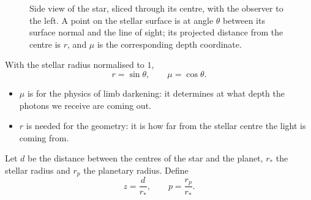 \documentclass[11pt,a4paper]{article}
\begin{document}
\begin{figure}[H]
  \centering
  \caption{Side view of the star, sliced through its centre, with the observer
  to the left. A point on the stellar surface is at angle $\theta$ between its
  surface normal and the line of sight; its projected distance from the centre
  is $r$, and $\mu$ is the corresponding depth coordinate.}
  \label{fig:conventions}
\end{figure}

With the stellar radius normalised to $1$,
\begin{equation}
  r = \sin\theta, \qquad \mu = \cos\theta .
\end{equation}
\begin{itemize}
  \item $\mu$ is for the physics of limb darkening: it determines at what
        depth the photons we receive are coming out.
  \item $r$ is needed for the geometry: it is how far from the stellar centre
        the light is coming from.
\end{itemize}

Let $d$ be the distance between the centres of the star and the planet, $r_*$
the stellar radius and $r_p$ the planetary radius. Define
\begin{equation}
  z = \frac{d}{r_*}, \qquad p = \frac{r_p}{r_*}.
\end{equation}
\end{document}
